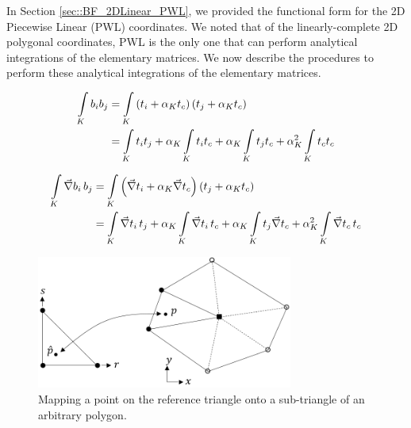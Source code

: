 In Section \ref{sec::BF_2DLinear_PWL}, we provided the functional form for the 2D Piecewise Linear (PWL) coordinates. We noted that of the linearly-complete 2D polygonal coordinates, PWL is the only one that can perform analytical integrations of the elementary matrices. We now describe the procedures to perform these analytical integrations of the elementary matrices.

\begin{equation}
\label{eq::App_BF_2D_triref_massterm}
\begin{aligned}
\int\displaylimits_K b_i b_j &= \int\displaylimits_K \left( t_i + \alpha_K t_c  \right) \left(  t_j + \alpha_K t_c \right) \\
&= \int\displaylimits_K t_i t_j + \alpha_K \int\displaylimits_K t_i t_c + \alpha_K \int\displaylimits_K t_j t_c + \alpha_K^2 \int\displaylimits_K t_c t_c
\end{aligned}
\end{equation}

\begin{equation}
\label{eq::App_BF_2D_triref_gradterm}
\begin{aligned}
\int\displaylimits_K \vec{\nabla} b_i \,  b_j &= \int\displaylimits_K \left( \vec{\nabla} t_i + \alpha_K \vec{\nabla} t_c  \right) \left(  t_j + \alpha_K t_c \right) \\
&= \int\displaylimits_K \vec{\nabla} t_i \,t_j + \alpha_K \int\displaylimits_K \vec{\nabla} t_i\, t_c + \alpha_K \int\displaylimits_K t_j \vec{\nabla} t_c + \alpha_K^2 \int\displaylimits_K \vec{\nabla} t_c \, t_c
\end{aligned}
\end{equation}

\begin{figure}
\centering
\includegraphics[width=0.75\textwidth]{figures/appendices/triangle_mapping_Rev1.png}
\caption{Mapping a point on the reference triangle onto a sub-triangle of an arbitrary polygon.}
\label{fig::BF_2D_tri_mapping}
\end{figure}



